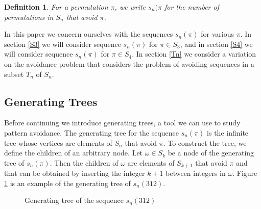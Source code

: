 \documentclass[11pt,letterpaper,twoside,english]{article}
\theoremstyle{theorem}
\newtheorem{definition}[theorem]{Definition}
\theoremstyle{remark}
\begin{document}
\begin{definition}
For a permutation $\pi$, we write $s_n(\pi$ for the number of permutations in $S_n$ that avoid $\pi$. 
\end{definition}

In this paper we concern ourselves with the sequences $s_n(\pi)$ for various $\pi$. In section \ref{S3} we will consider sequence $s_n(\pi)$ for $\pi\in S_3$, and in section \ref{S4} we will consider sequence $s_n(\pi)$ for $\pi\in S_4$. In section \ref{Tn} we consider a variation on the avoidance problem that considers the problem of avoiding sequences in a subset $T_n$ of $S_n$. 

\subsection{Generating Trees}

Before continuing we introduce generating trees, a tool we can use to study pattern avoidance. The generating tree for the sequence $s_n(\pi)$ is the infinite tree whose vertices are elements of $S_n$ that avoid $\pi$. To construct the tree, we define the children of an arbitrary node. Let $\omega\in S_k$ be a node of the generating tree of $s_n(\pi)$. Then the children of $\omega$ are elements of $S_{k+1}$ that avoid $\pi$ and that can be obtained by inserting the integer $k+1$ between integers in $\omega$. Figure \ref{fig:M1} is an example of the generating tree of $s_n(312)$. 

\begin{figure}[h!]
\caption{Generating tree of the sequence $s_n(312)$} \label{fig:M1}
\end{figure}
\end{document}
